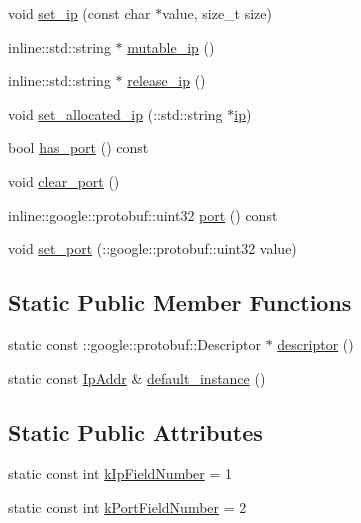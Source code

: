 \begin{DoxyCompactItemize}
void \hyperlink{class_i_m_1_1_base_define_1_1_ip_addr_ab3fb3a62dc5abfbdc5f65537086ebc87}{set\+\_\+ip} (const char $\ast$value, size\+\_\+t size)
\item 
inline\+::std\+::string $\ast$ \hyperlink{class_i_m_1_1_base_define_1_1_ip_addr_aff0adb77c56848b2c6f32d7052edcee6}{mutable\+\_\+ip} ()
\item 
inline\+::std\+::string $\ast$ \hyperlink{class_i_m_1_1_base_define_1_1_ip_addr_ad24886fed4c21eaa818e0c41e365fe0e}{release\+\_\+ip} ()
\item 
void \hyperlink{class_i_m_1_1_base_define_1_1_ip_addr_a5a9fc1198224ab5cb410dff71b4b0cf3}{set\+\_\+allocated\+\_\+ip} (\+::std\+::string $\ast$\hyperlink{class_i_m_1_1_base_define_1_1_ip_addr_a4950efb8280c5ef13651698c24332e43}{ip})
\item 
bool \hyperlink{class_i_m_1_1_base_define_1_1_ip_addr_aecb713141298a0e78cecbe29528cdd02}{has\+\_\+port} () const 
\item 
void \hyperlink{class_i_m_1_1_base_define_1_1_ip_addr_adfe6ff0eb470f648a384a39748a25402}{clear\+\_\+port} ()
\item 
inline\+::google\+::protobuf\+::uint32 \hyperlink{class_i_m_1_1_base_define_1_1_ip_addr_a54c98764b14fca033c545e19f9ad82c5}{port} () const 
\item 
void \hyperlink{class_i_m_1_1_base_define_1_1_ip_addr_a9377e9ed3ea16f63a2d645ed16bdbe07}{set\+\_\+port} (\+::google\+::protobuf\+::uint32 value)
\end{DoxyCompactItemize}
\subsection*{Static Public Member Functions}
\begin{DoxyCompactItemize}
\item 
static const \+::google\+::protobuf\+::\+Descriptor $\ast$ \hyperlink{class_i_m_1_1_base_define_1_1_ip_addr_a94d182d242f8f0c25602f46035d3643e}{descriptor} ()
\item 
static const \hyperlink{class_i_m_1_1_base_define_1_1_ip_addr}{Ip\+Addr} \& \hyperlink{class_i_m_1_1_base_define_1_1_ip_addr_acb5a858a0b7276ca1980d866d7424125}{default\+\_\+instance} ()
\end{DoxyCompactItemize}
\subsection*{Static Public Attributes}
\begin{DoxyCompactItemize}
\item 
static const int \hyperlink{class_i_m_1_1_base_define_1_1_ip_addr_a10452338c6635c9a851ffe4b52d8b476}{k\+Ip\+Field\+Number} = 1
\item 
static const int \hyperlink{class_i_m_1_1_base_define_1_1_ip_addr_ab4adf1e52557be5d577e8b96842385df}{k\+Port\+Field\+Number} = 2
\end{DoxyCompactItemize}
